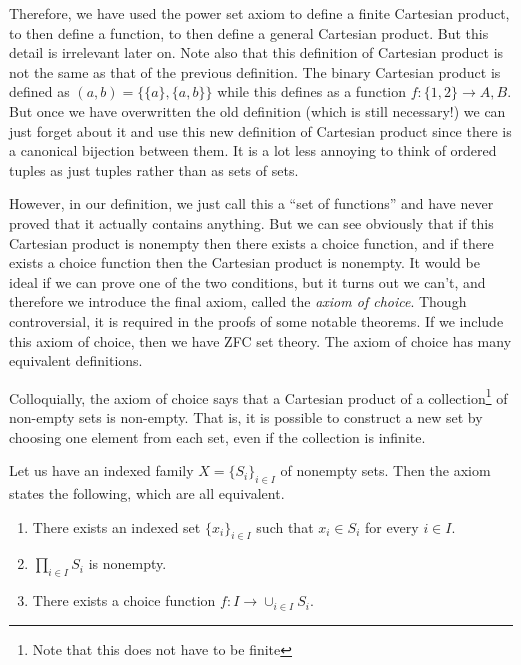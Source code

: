 \documentclass{article}
\begin{document}
    Therefore, we have used the power set axiom to define a finite Cartesian product, to then define a function, to then define a general Cartesian product. But this detail is irrelevant later on. Note also that this definition of Cartesian product is not the same as that of the previous definition. The binary Cartesian product is defined as $(a, b) = \{\{a\}, \{a, b\}\}$ while this defines as a function $f: \{1, 2\} \rightarrow A, B$. But once we have overwritten the old definition (which is still necessary!) we can just forget about it and use this new definition of Cartesian product since there is a canonical bijection between them. It is a lot less annoying to think of ordered tuples as just tuples rather than as sets of sets. 

    However, in our definition, we just call this a ``set of functions'' and have never proved that it actually contains anything. But we can see obviously that if this Cartesian product is nonempty then there exists a choice function, and if there exists a choice function then the Cartesian product is nonempty. It would be ideal if we can prove one of the two conditions, but it turns out we can't, and therefore we introduce the final axiom, called the \textit{axiom of choice}. Though controversial, it is required in the proofs of some notable theorems. If we include this axiom of choice, then we have ZFC set theory. The axiom of choice has many equivalent definitions. 

    Colloquially, the axiom of choice says that a Cartesian product of a collection\footnote{Note that this does not have to be finite} of non-empty sets is non-empty. That is, it is possible to construct a new set by choosing one element from each set, even if the collection is infinite. 

    \begin{axiom}
      Let us have an indexed family $X = \{S_i\}_{i \in I}$ of nonempty sets. Then the axiom states the following, which are all equivalent. 
      \begin{enumerate}
        \item There exists an indexed set $\{x_i\}_{i \in I}$ such that $x_i \in S_i$ for every $i \in I$. 
        \item $\prod_{i \in I} S_i$ is nonempty. 
        \item There exists a choice function $f: I \rightarrow \cup_{i \in I} S_i$. 
      \end{enumerate}
    \end{axiom}
\end{document}

